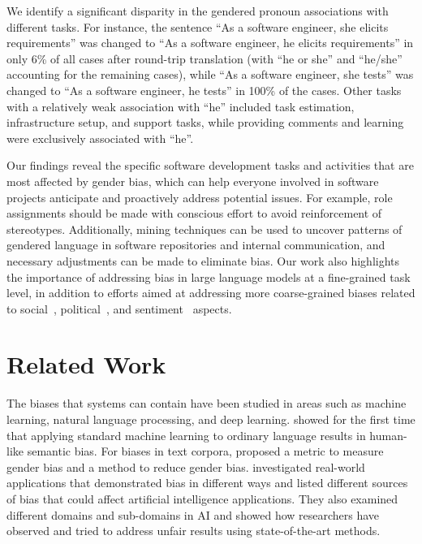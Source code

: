 \documentclass[10pt,conference]{IEEEtran}
\begin{document}
\begin{sloppy}
We identify a significant disparity in the gendered pronoun associations with different tasks. For instance, the sentence ``As a software engineer, she elicits requirements'' was changed to ``As a software engineer, he elicits requirements'' in only 6\% of all cases after round-trip translation (with ``he or she'' and ``he/she'' accounting for the remaining cases), while ``As a software engineer, she tests'' was changed to ``As a software engineer, he tests'' in 100\% of the cases. Other tasks with a relatively weak association with ``he'' included task estimation, infrastructure setup, and support tasks, while providing comments and learning were exclusively associated with ``he''.

Our findings reveal the specific software development tasks and activities that are most affected by gender bias, which can help everyone involved in software projects anticipate and proactively address potential issues. For example, role assignments should be made with conscious effort to avoid reinforcement of stereotypes. Additionally, mining techniques can be used to uncover patterns of gendered language in software repositories and internal communication, and necessary adjustments can be made to eliminate bias. Our work also highlights the importance of addressing bias in large language models at a fine-grained task level, in addition to efforts aimed at addressing more coarse-grained biases related to social~\cite{liang2021towards}, political~\cite{liu2021mitigating}, and sentiment~\cite{huang2020reducing} aspects.

\section{Related Work}

The biases that systems can contain have been studied in areas such as machine learning, natural language processing, and deep learning.
\citet{caliskan2017semantics} showed for the first time that applying standard machine learning to ordinary language results in human-like semantic bias.
For biases in text corpora, \citet{bordia2019identifying} proposed a metric to measure gender bias and a method to reduce gender bias.
\citet{10.1145/3457607} investigated real-world applications that demonstrated bias in different ways and listed different sources of bias that could affect artificial intelligence applications. They also examined different domains and sub-domains in AI and showed how researchers have observed and tried to address unfair results using state-of-the-art methods.


\end{sloppy}
\end{document}
